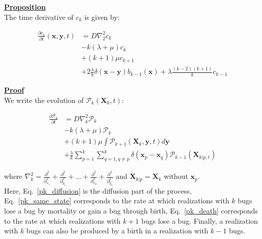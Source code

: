 \textbf{\underline{Proposition}}\\

The time derivative of $c_k$ is given by:

\begin{subequations} 
\begin{align}
\frac{\partial c_{k}}{\partial t}(\boldsymbol{x},\boldsymbol{y},t) & =D\nabla_{2}^{2}c_{k}\label{ck_diffusion-1}\\
 & -k(\lambda+\mu)c_{k}\label{ck_same_state-1}\\
 & +(k+1)\mu c_{k+1}\label{ck_death-1}\\
 & +2\frac{\lambda}{k}\delta(\boldsymbol{x}-\boldsymbol{y})b_{k-1}(\boldsymbol{x})+\lambda\frac{(k-2)(k+1)}{k}c_{k-1}\label{ck_birth-1}
\end{align}
\end{subequations}

\newpage

\textbf{\underline{Proof}}\\

We write the evolution of $\mathcal{P}_{k}(\boldsymbol{X}_{k},t)$:

\begin{subequations} 
\begin{align}
\frac{\partial\mathcal{P}_{k}}{\partial t} & =D\nabla_{k}^{2}\mathcal{P}_{k}\label{pk_diffusion}\\
 & -k(\lambda+\mu)\mathcal{P}_{k}\label{pk_same_state}\\
 & +(k+1)\mu\int\mathcal{P}_{k+1}(\boldsymbol{X}_{k},\boldsymbol{y},t)d\boldsymbol{y}\label{pk_death}\\
 & +\frac{\lambda}{k}\sum_{p=1}^{k}\sum_{q=1,q\neq p}^{k}\delta({\boldsymbol{x}_p-\boldsymbol{x}_q})\mathcal{P}_{k-1}(\boldsymbol{X}_{k|p,t})\label{pk_birth}
\end{align}
\end{subequations}

where $\nabla_{k}^{2}=\frac{\partial^{2}}{\partial_{x_{1}}^{2}}+\frac{\partial^{2}}{\partial_{y_{1}}^{2}}+\ldots+\frac{\partial^{2}}{\partial_{x_{k}}^{2}}+\frac{\partial^{2}}{\partial_{y_{k}}^{2}}$ and $\boldsymbol{X}_{k|p}=\boldsymbol{X}_{k}$
without $\boldsymbol{x}_{p}$. \\

Here, Eq.~\ref{pk_diffusion} is the diffusion part of the process, 
Eq.~\ref{pk_same_state} corresponds to the rate at which realizations with $k$ bugs lose a bug by mortality or gain a bug through birth,  Eq.~\ref{pk_death} corresponds to the rate at which realizations with $k+1$ bugs lose a bug. Finally, a realization with $k$ bugs can also be produced by a birth in a realization with $k-1$ bugs. \\

